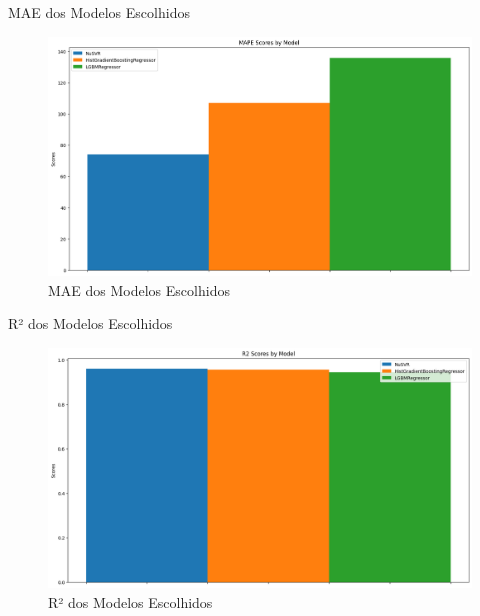 \documentclass{beamer}
\begin{document}
\begin{frame}{MAE dos Modelos Escolhidos}
    \begin{figure}[H]
        \centering
        \includegraphics[width=1\linewidth]{10.png}
        \caption{MAE dos Modelos Escolhidos}
    \end{figure}
\end{frame}

\begin{frame}{R² dos Modelos Escolhidos}
    \begin{figure}[H]
        \centering
        \includegraphics[width=1\linewidth]{12.png}
        \caption{R² dos Modelos Escolhidos}
    \end{figure}
\end{frame}
\end{document}
